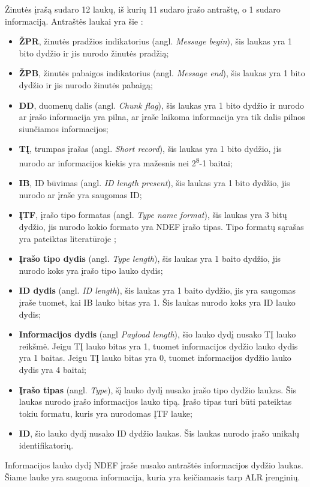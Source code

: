 Žinutės įrašą sudaro 12 laukų, iš kurių 11 sudaro įrašo antraštę, o 1 sudaro informaciją.
Antraštės laukai yra šie \cite{NFCForum2006}: 
\begin{itemize}
    \item \textbf{ŽPR}, žinutės pradžios indikatorius (angl. \textit{Message begin}), šis laukas yra 1 bito dydžio ir jis nurodo žinutės pradžią;
    \item \textbf{ŽPB}, žinutės pabaigos indikatorius (angl. \textit{Message end}), šis laukas yra 1 bito dydžio ir jis nurodo žinutės pabaigą;
    \item \textbf{DD}, duomenų dalis (angl. \textit{Chunk flag}), šis laukas yra 1 bito dydžio ir nurodo ar įrašo informacija yra pilna, ar įraše laikoma informacija yra tik dalis pilnos siunčiamos informacijos;
    \item \textbf{TĮ}, trumpas įrašas (angl. \textit{Short record}), šis laukas yra 1 bito dydžio, jis nurodo ar informacijos kiekis yra mažesnis nei 2\textsuperscript{8}-1 baitai;
    \item \textbf{IB}, ID būvimas (angl. \textit{ID length present}), šis laukas yra 1 bito dydžio, jis nurodo ar įraše yra saugomas ID;
    \item \textbf{ĮTF}, įrašo tipo formatas (angl. \textit{Type name format}), šis laukas yra 3 bitų dydžio, jis nurodo kokio formato yra NDEF įrašo tipas. Tipo formatų sąrašas yra pateiktas literatūroje \cite{Leora1980};
    \item \textbf{Įrašo tipo dydis} (angl. \textit{Type length}), šis laukas yra 1 baito dydžio, jis nurodo koks yra įrašo tipo lauko dydis;
    \item \textbf{ID dydis} (angl. \textit{ID length}), šis laukas yra 1 baito dydžio, jis yra saugomas įraše tuomet, kai IB lauko bitas yra 1. Šis laukas nurodo koks yra ID lauko dydis;
    \item \textbf{Informacijos dydis} (angl \textit{Payload length}), šio lauko dydį nusako TĮ lauko reikšmė. Jeigu TĮ lauko bitas yra 1, tuomet informacijos dydžio lauko dydis yra 1 baitas. Jeigu TĮ lauko bitas yra 0, tuomet informacijos dydžio lauko dydis yra 4 baitai;
    \item \textbf{Įrašo tipas} (angl. \textit{Type}), šį lauko dydį nusako įrašo tipo dydžio laukas. Šis laukas nurodo įrašo informacijos lauko tipą. Įrašo tipas turi būti pateiktas tokiu formatu, kuris yra nurodomas ĮTF lauke;
    \item \textbf{ID}, šio lauko dydį nusako ID dydžio laukas. Šis laukas nurodo įrašo unikalų identifikatorių.
\end{itemize}
Informacijos lauko dydį NDEF įraše nusako antraštės informacijos dydžio laukas. Šiame lauke yra saugoma informacija, kuria yra keičiamasis tarp ALR įrenginių.


